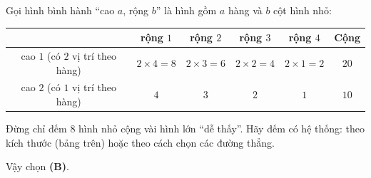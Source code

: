 {
Gọi hình bình hành ``cao $a$, rộng $b$'' là hình gồm $a$ hàng và $b$ cột hình nhỏ:
\begin{center}\begin{tabular}{|c|c|c|c|c|c|}\hline
 & rộng $1$ & rộng $2$ & rộng $3$ & rộng $4$ & Cộng\\\hline
cao $1$ (có $2$ vị trí theo hàng) & $2\times4=8$ & $2\times3=6$ & $2\times2=4$ & $2\times1=2$ & $20$\\\hline
cao $2$ (có $1$ vị trí theo hàng) & $4$ & $3$ & $2$ & $1$ & $10$\\\hline
\end{tabular}\end{center}
\begin{warnbox}Đừng chỉ đếm $8$ hình nhỏ cộng vài hình lớn ``dễ thấy''. Hãy đếm có hệ thống: theo kích thước
(bảng trên) hoặc theo cách chọn các đường thẳng.\end{warnbox}
Vậy chọn \textbf{(B)}.
}

